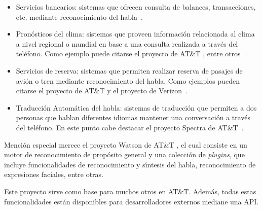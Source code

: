 \begin{itemize}
	\item Servicios bancarios: sistemas que ofrecen consulta de balances, transacciones, etc. mediante
	reconocimiento del \mbox{habla \cite{PreeEnhancing1999}}.

	\item Pron\'osticos del clima: sistemas que proveen informaci\'on relacionada al clima a nivel regional o mundial
	en base a una consulta realizada a trav\'es del tel\'efono. Como ejemplo puede citarse el proyecto 
	de AT\&T \cite{ZueJupiter2000}, entre \mbox{otros \cite{ZibertBiliengual2003}}.

	\item Servicios de reserva: sistemas que permiten realizar reserva de pasajes de avi\'on o tren mediante
	reconocimiento del habla. Como ejemplos pueden citarse el proyecto  de AT\&T \cite{Seneff2000Dialogue} 
    y el proyecto  de \mbox{Verizon \cite{StallardEvaluation2001}}.

	\item Traducci\'on Autom\'atica del habla: sistemas de traducci\'on que permiten a dos personas que hablan
	diferentes idiomas mantener una conversaci\'on a trav\'es del tel\'efono. En este punto cabe destacar el
	proyecto Spectra de \mbox{AT\&T \cite{Rangarajan2012}}.
\end{itemize}

Menci\'on especial merece el proyecto Watson de AT\&T \cite{AttWatson}, el cual consiste en un motor de reconocimiento de 
prop\'osito general y una colecci\'on de \emph{plugins}, que incluye funcionalidades de reconocimiento y s{\'\i}ntesis
del habla, reconocimiento de expresiones faciales, entre otras. 

Este proyecto sirve como base para muchos otros en AT\&T. Adem\'as, todas estas funcionalidades est\'an
disponibles para desarrolladores externos mediane una API. 